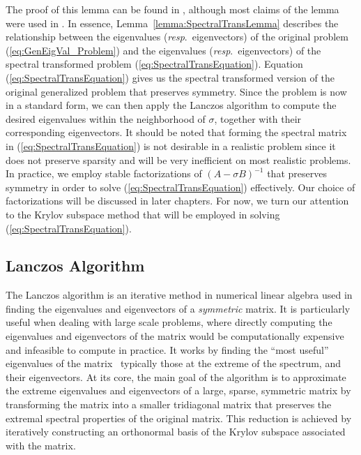  The proof of this lemma can be found in \cite{stewart2024spectraltransformationdensesymmetric}, although most claims of the lemma were used in \cite{Ericsson1980TheST}. In essence, Lemma~\ref{lemma:SpectralTransLemma} describes the relationship between the eigenvalues (\textit{resp}.\ eigenvectors) of the original problem (\ref{eq:GenEigVal_Problem}) and the eigenvalues (\textit{resp}.\ eigenvectors) of the spectral transformed problem (\ref{eq:SpectralTransEquation}). Equation (\ref{eq:SpectralTransEquation}) gives us the spectral transformed version of the original generalized problem that preserves symmetry. Since the problem is now in a standard form, we can then apply the Lanczos algorithm to compute the desired eigenvalues within the neighborhood of $\sigma$, together with their corresponding eigenvectors. It should be noted that forming the spectral matrix in (\ref{eq:SpectralTransEquation}) is not desirable in a realistic problem since it does not preserve sparsity and will be very inefficient on most realistic problems. In practice, we employ stable factorizations of $(A-\sigma B)^{-1}$ that preserves symmetry in order to solve (\ref{eq:SpectralTransEquation}) effectively. Our choice of factorizations will be discussed in later chapters. For now, we turn our attention to the Krylov subspace method that will be employed in solving (\ref{eq:SpectralTransEquation}).

\subsection{Lanczos Algorithm}\label{sec:LanczosAlgorithm}

The Lanczos algorithm is an iterative method in numerical linear algebra used in finding the eigenvalues and eigenvectors of a \textit{symmetric} matrix. It is particularly useful when dealing with large scale problems, where directly computing the eigenvalues and eigenvectors of the matrix would be computationally expensive and infeasible to compute in practice. It works by finding the ``most useful'' eigenvalues of the matrix \textemdash\, typically those at the extreme of the spectrum, and their eigenvectors. At its core, the main goal of the algorithm is to approximate the extreme eigenvalues and eigenvectors of a large, sparse, symmetric matrix by transforming the matrix into a smaller tridiagonal matrix that preserves the extremal spectral properties of the original matrix. This reduction is achieved by iteratively constructing an orthonormal basis of the Krylov subspace associated with the matrix.

